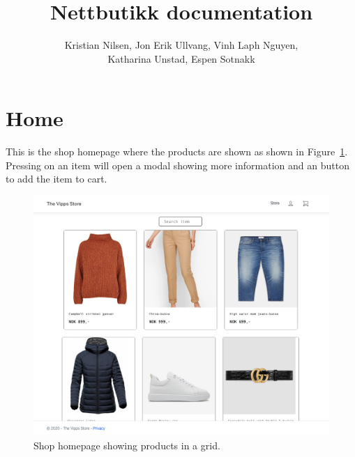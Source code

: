 \documentclass[11pt,a4paper,english]{article}
\title{Nettbutikk documentation}
\author{Kristian Nilsen, Jon Erik Ullvang, Vinh Laph Nguyen,\\ Katharina Unstad, Espen Sotnakk}
\begin{document}
\maketitle
{}\selectfont
\section*{Home}
This is the shop homepage where the products are shown as shown in Figure~\ref{fig:home}. Pressing on an item will open a modal showing more information and an button to add the item to cart.
\begin{figure}[htbp]
  \centering
  \includegraphics[scale=0.2]{home}
  \caption{Shop homepage showing products in a grid.}
  \label{fig:home}
\end{figure}
\end{document}
